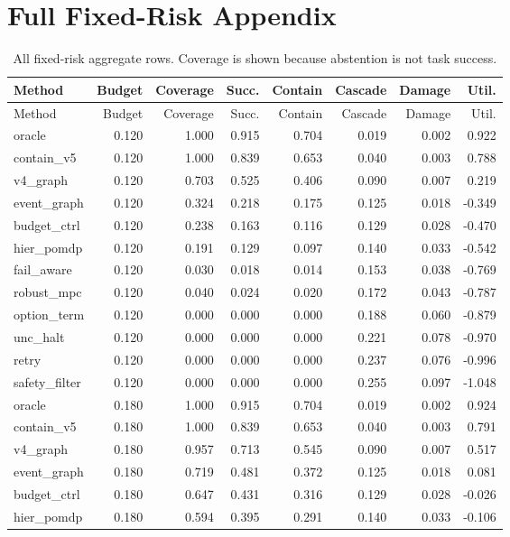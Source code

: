\documentclass{article}
\begin{document}
\section{Full Fixed-Risk Appendix}
\begin{longtable}{@{}lrrrrrrr@{}}
\caption{All fixed-risk aggregate rows. Coverage is shown because abstention is not task success.}\\
\toprule
Method & Budget & Coverage & Succ. & Contain & Cascade & Damage & Util.\\
\midrule
\endfirsthead
\toprule
Method & Budget & Coverage & Succ. & Contain & Cascade & Damage & Util.\\
\midrule
\endhead
oracle & 0.120 & 1.000 & 0.915 & 0.704 & 0.019 & 0.002 & 0.922 \\
contain\_v5 & 0.120 & 1.000 & 0.839 & 0.653 & 0.040 & 0.003 & 0.788 \\
v4\_graph & 0.120 & 0.703 & 0.525 & 0.406 & 0.090 & 0.007 & 0.219 \\
event\_graph & 0.120 & 0.324 & 0.218 & 0.175 & 0.125 & 0.018 & -0.349 \\
budget\_ctrl & 0.120 & 0.238 & 0.163 & 0.116 & 0.129 & 0.028 & -0.470 \\
hier\_pomdp & 0.120 & 0.191 & 0.129 & 0.097 & 0.140 & 0.033 & -0.542 \\
fail\_aware & 0.120 & 0.030 & 0.018 & 0.014 & 0.153 & 0.038 & -0.769 \\
robust\_mpc & 0.120 & 0.040 & 0.024 & 0.020 & 0.172 & 0.043 & -0.787 \\
option\_term & 0.120 & 0.000 & 0.000 & 0.000 & 0.188 & 0.060 & -0.879 \\
unc\_halt & 0.120 & 0.000 & 0.000 & 0.000 & 0.221 & 0.078 & -0.970 \\
retry & 0.120 & 0.000 & 0.000 & 0.000 & 0.237 & 0.076 & -0.996 \\
safety\_filter & 0.120 & 0.000 & 0.000 & 0.000 & 0.255 & 0.097 & -1.048 \\
oracle & 0.180 & 1.000 & 0.915 & 0.704 & 0.019 & 0.002 & 0.924 \\
contain\_v5 & 0.180 & 1.000 & 0.839 & 0.653 & 0.040 & 0.003 & 0.791 \\
v4\_graph & 0.180 & 0.957 & 0.713 & 0.545 & 0.090 & 0.007 & 0.517 \\
event\_graph & 0.180 & 0.719 & 0.481 & 0.372 & 0.125 & 0.018 & 0.081 \\
budget\_ctrl & 0.180 & 0.647 & 0.431 & 0.316 & 0.129 & 0.028 & -0.026 \\
hier\_pomdp & 0.180 & 0.594 & 0.395 & 0.291 & 0.140 & 0.033 & -0.106 \\

\end{longtable}
\end{document}
